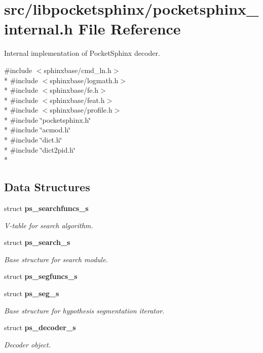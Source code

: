 \section{src/libpocketsphinx/pocketsphinx\-\_\-internal.h File Reference}
\label{pocketsphinx__internal_8h}


Internal implementation of Pocket\-Sphinx decoder.  


{\ttfamily \#include $<$sphinxbase/cmd\-\_\-ln.\-h$>$}\\*
{\ttfamily \#include $<$sphinxbase/logmath.\-h$>$}\\*
{\ttfamily \#include $<$sphinxbase/fe.\-h$>$}\\*
{\ttfamily \#include $<$sphinxbase/feat.\-h$>$}\\*
{\ttfamily \#include $<$sphinxbase/profile.\-h$>$}\\*
{\ttfamily \#include \char`\"{}pocketsphinx.\-h\char`\"{}}\\*
{\ttfamily \#include \char`\"{}acmod.\-h\char`\"{}}\\*
{\ttfamily \#include \char`\"{}dict.\-h\char`\"{}}\\*
{\ttfamily \#include \char`\"{}dict2pid.\-h\char`\"{}}\\*
\subsection*{Data Structures}
\begin{DoxyCompactItemize}
\item 
struct {\bf ps\-\_\-searchfuncs\-\_\-s}
\begin{DoxyCompactList}\small\item\em V-\/table for search algorithm. \end{DoxyCompactList}\item 
struct {\bf ps\-\_\-search\-\_\-s}
\begin{DoxyCompactList}\small\item\em Base structure for search module. \end{DoxyCompactList}\item 
struct {\bf ps\-\_\-segfuncs\-\_\-s}
\item 
struct {\bf ps\-\_\-seg\-\_\-s}
\begin{DoxyCompactList}\small\item\em Base structure for hypothesis segmentation iterator. \end{DoxyCompactList}\item 
struct {\bf ps\-\_\-decoder\-\_\-s}
\begin{DoxyCompactList}\small\item\em Decoder object. \end{DoxyCompactList}\end{DoxyCompactItemize}
